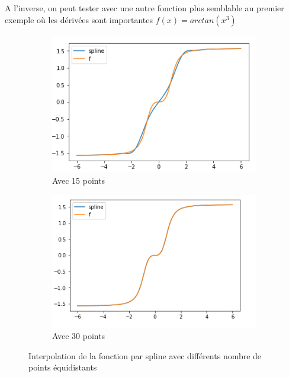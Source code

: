 A l'inverse, on peut tester avec une autre fonction plus semblable au premier exemple où les dérivées sont importantes $f(x) = arctan(x^3)$
\begin{figure}[h]
  \centering
  \begin{subfigure}[b]{0.4\linewidth}
    \includegraphics[width=\linewidth]{fig12}
    \caption{Avec 15 points}
  \end{subfigure}
  \begin{subfigure}[b]{0.4\linewidth}
    \includegraphics[width=\linewidth]{fig13}
    \caption{Avec 30 points}
  \end{subfigure}
  \caption{Interpolation de la fonction par spline avec différents nombre de points équidistants}
  \label{fig:8:fspl2}
\end{figure}

